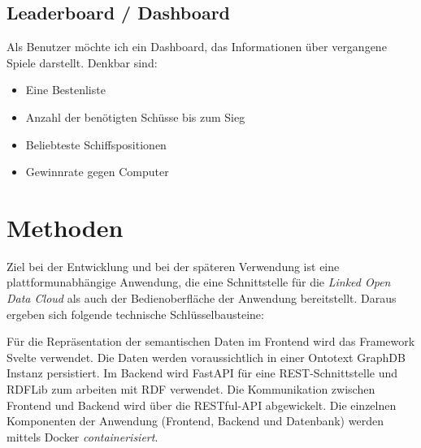 \documentclass[a4paper, 10pt, conference]{IEEEtran}
\begin{document}
\subsection{Leaderboard / Dashboard}
Als Benutzer möchte ich ein Dashboard, das Informationen über vergangene Spiele darstellt. Denkbar sind:
\begin{itemize}
	\item Eine Bestenliste
	\item Anzahl der benötigten Schüsse bis zum Sieg
	\item Beliebteste Schiffspositionen
	\item Gewinnrate gegen Computer
\end{itemize}


\section{Methoden}\label{sec:methoden}

Ziel bei der Entwicklung und bei der späteren Verwendung ist eine plattformunabhängige Anwendung, die eine Schnittstelle für die \textit{Linked Open Data Cloud} als auch der Bedienoberfläche der Anwendung bereitstellt. Daraus ergeben sich folgende technische Schlüsselbausteine:

Für die Repräsentation der semantischen Daten im Frontend wird das Framework Svelte verwendet. Die Daten werden voraussichtlich in einer Ontotext GraphDB Instanz persistiert. Im Backend wird FastAPI für eine REST-Schnittstelle und RDFLib zum arbeiten mit RDF verwendet. Die Kommunikation zwischen Frontend und Backend wird über die RESTful-API abgewickelt. Die einzelnen Komponenten der Anwendung (Frontend, Backend und Datenbank) werden mittels Docker \textit{containerisiert}.


\printbibliography
\end{document}
